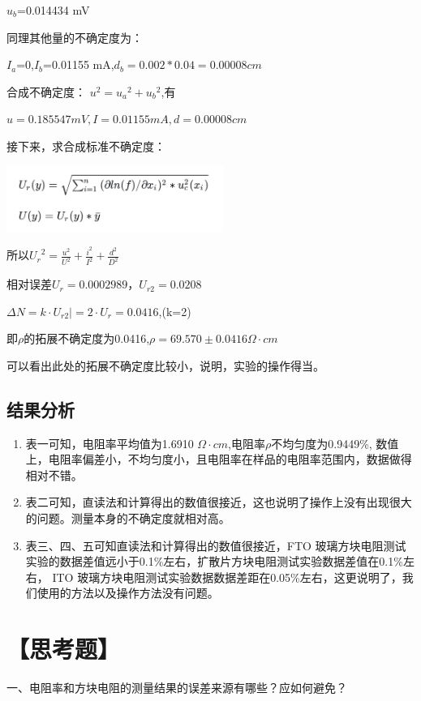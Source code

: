 \documentclass[a4paper,utf8]{article}
\begin{document}
    $u_b$=0.014434 mV
    
    同理其他量的不确定度为：

    $I_a$=0,$I_b$=0.01155 mA,$d_b=0.002*0.04=0.00008cm$

    合成不确定度：
    $u^2={u_a}^{2} + {u_b}^{2}$,有

    $u=0.185547 mV ,I=0.01155mA,d=0.00008cm$

    接下来，求合成标准不确定度：
    \begin{center}
        \includegraphics[width=200pt]{4.png}
    \end{center}

    所以${U_r}^2= \frac{u^2}{{U}^2} + \frac{i^2}{{I}^2} + \frac{d^2}{{D}^2}$
    
    相对误差$U_r=0.0002989$，$U_{r2}=0.0208 $

    $\Delta N=k \cdot U_{r2}| =2 \cdot U_r=0.0416$,(k=2)

    即$\rho $的拓展不确定度为0.0416,$\rho =69.570 \pm 0.0416 \Omega \cdot cm$

    可以看出此处的拓展不确定度比较小，说明，实验的操作得当。

\subsection*{结果分析}
        \begin{enumerate}
            \item 表一可知，电阻率平均值为1.6910 $ \Omega \cdot cm$,电阻率$ \rho $不均匀度为0.9449\%,
            数值上，电阻率偏差小，不均匀度小，且电阻率在样品的电阻率范围内，数据做得相对不错。
            \item 表二可知，直读法和计算得出的数值很接近，这也说明了操作上没有出现很大的问题。测量本身的不确定度就相对高。
            \item 表三、四、五可知直读法和计算得出的数值很接近，FTO 玻璃方块电阻测试实验的数据差值远小于0.1\%左右，扩散片方块电阻测试实验数据差值在0.1\%左右，
            ITO 玻璃方块电阻测试实验数据数据差距在0.05\%左右，这更说明了，我们使用的方法以及操作方法没有问题。					

        \end{enumerate}
\section*{【思考题】}
\begin{center}
    一、电阻率和方块电阻的测量结果的误差来源有哪些？应如何避免？ 
\end{center}
 
\end{document}
